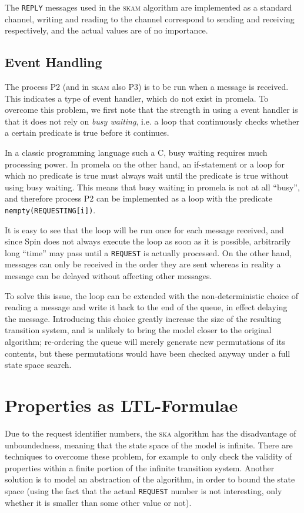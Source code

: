 \documentclass[a4paper,10pt]{llncs}
\begin{document}
The \texttt{REPLY} messages used in the \textsc{skam} algorithm are implemented as a standard channel, writing and reading to the channel correspond to sending and receiving respectively, and the actual values are of no importance.

\subsection{Event Handling}
The process P2 (and in \textsc{skam} also P3) is to be run when a message is received. This indicates a type of event handler, which do not exist in promela. To overcome this problem, we first note that the strength in using a event handler is that it does not rely on \emph{busy waiting}, i.e. a loop that continuously checks whether a certain predicate is true before it continues.

In a classic programming language such a C, busy waiting requires much processing power. In promela on the other hand, an if-statement or a loop for which no predicate is true must always wait until the predicate is true without using busy waiting. This means that busy waiting in promela is not at all ``busy'', and therefore  process P2 can be implemented as a loop with the predicate \texttt{nempty(REQUESTING[i])}.

It is easy to see that the loop will be run once for each message received, and since Spin does not always execute the loop as soon as it is possible, arbitrarily long ``time'' may pass until a \texttt{REQUEST} is actually processed. On the other hand, messages can only be received in the order they are sent whereas in reality a message can be delayed without affecting other messages. 

To solve this issue, the loop can be extended with the non-deterministic choice of reading a message and write it back to the end of the queue, in effect delaying the message. Introducing this choice greatly increase the size of the resulting transition system, and is unlikely to bring the model closer to the original algorithm; re-ordering the queue will merely generate new permutations of its contents, but these permutations would have been checked anyway under a full state space search.


\section{Properties as LTL-Formulae}
Due to the request identifier numbers, the \textsc{ska} algorithm has the disadvantage of unboundedness, meaning that the state space of the model is infinite. There are techniques to overcome these problem, for example to only check the validity of properties within a finite portion of the infinite transition system. Another solution is to model an abstraction of the algorithm, in order to bound the state space (using the fact that the actual \texttt{REQUEST} number is not interesting, only whether it is smaller than some other value or not).
\end{document}
